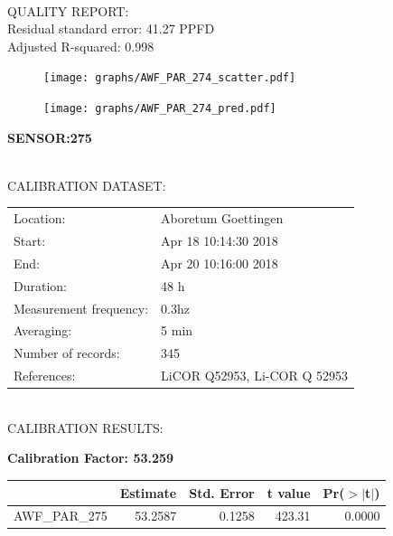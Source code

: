 \documentclass[oneside]{report}
\begin{document}
\hrulefill\\
QUALITY REPORT:\\
Residual standard error: 41.27 PPFD\\
Adjusted R-squared: 0.998



\begin{figure}[H]
  \centering
  \texttt{[image: graphs/AWF\_PAR\_274\_scatter.pdf]}
\end{figure}




\begin{figure}[H]
  \centering
  \texttt{[image: graphs/AWF\_PAR\_274\_pred.pdf]}
\end{figure}

\pagebreak


\begin{center}
\large{\textbf{SENSOR:275}}\\
\end{center}

\hrulefill\\
CALIBRATION DATASET:\\
\begin{table}[h!]
  \centering
  \label{tab:table1}
  \begin{tabular}{ll}
    Location: & Aboretum Goettingen\\ 
    
    
    Start:  & Apr 18 10:14:30 2018 \\
    End:   & Apr 20 10:16:00 2018\\ 
    Duration: & 48 h\\
    Measurement frequency: & 0.3hz\\
    Averaging:  &5 min\\
    Number of records: & 345 \\
    References: & LiCOR Q52953, Li-COR Q 52953 \\
  \end{tabular}
\end{table}

\hrulefill\\
CALIBRATION RESULTS:\\


\begin{center}
\textbf{\large{Calibration Factor: 53.259}}\\
\end{center}
\begin{table}[ht]
\centering
\begin{tabular}{rrrrr}
  \hline
 & Estimate & Std. Error & t value & Pr($>$$|$t$|$) \\ 
  \hline
AWF\_PAR\_275 & 53.2587 & 0.1258 & 423.31 & 0.0000 \\ 
   \hline
\end{tabular}
\end{table}
\end{document}
